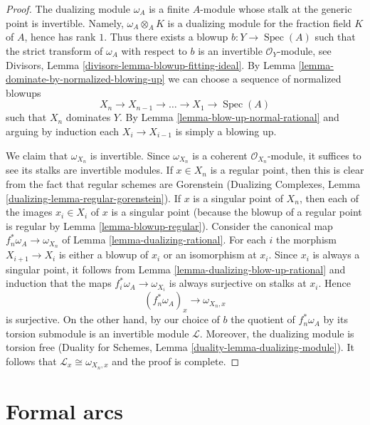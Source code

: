 \documentclass{stacks-project}
\theoremstyle{plain}
\theoremstyle{definition}
\theoremstyle{remark}
\numberwithin{equation}{subsection}
\def\Spec{\mathop{\mathrm{Spec}}}
\begin{document}
\begin{proof}
The dualizing module $\omega_A$ is a finite $A$-module whose stalk at
the generic point is invertible. Namely, $\omega_A \otimes_A K$
is a dualizing module for the fraction field $K$ of $A$, hence has
rank $1$. Thus there exists a blowup $b : Y \to \Spec(A)$ such that
the strict transform of $\omega_A$ with respect to $b$ is an invertible
$\mathcal{O}_Y$-module, see
Divisors, Lemma \ref{divisors-lemma-blowup-fitting-ideal}.
By Lemma \ref{lemma-dominate-by-normalized-blowing-up}
we can choose a sequence of normalized blowups
$$
X_n \to X_{n - 1} \to \ldots \to X_1 \to \Spec(A)
$$
such that $X_n$ dominates $Y$. By Lemma \ref{lemma-blow-up-normal-rational}
and arguing by induction each $X_i \to X_{i - 1}$ is simply a blowing up.

\medskip\noindent
We claim that $\omega_{X_n}$ is invertible. Since $\omega_{X_n}$
is a coherent $\mathcal{O}_{X_n}$-module, it suffices to see its stalks
are invertible modules. If $x \in X_n$ is a regular point, then this is
clear from the fact that regular schemes are
Gorenstein (Dualizing Complexes, Lemma
\ref{dualizing-lemma-regular-gorenstein}). If $x$ is a singular point of
$X_n$, then each of the images $x_i \in X_i$ of $x$ is a singular point
(because the blowup of a regular point is regular by
Lemma \ref{lemma-blowup-regular}).
Consider the canonical map $f_n^*\omega_A \to \omega_{X_n}$ of
Lemma \ref{lemma-dualizing-rational}. For each $i$ the morphism
$X_{i + 1} \to X_i$ is either a blowup of $x_i$ or an isomorphism
at $x_i$. Since $x_i$ is always a singular point, it follows from
Lemma \ref{lemma-dualizing-blow-up-rational}
and induction that the maps $f_i^*\omega_A \to \omega_{X_i}$
is always surjective on stalks at $x_i$. Hence
$$
(f_n^*\omega_A)_x \longrightarrow \omega_{X_n, x}
$$
is surjective. On the other hand, by our choice of $b$ the quotient
of $f_n^*\omega_A$ by its torsion submodule is an invertible module
$\mathcal{L}$. Moreover, the dualizing module is torsion free
(Duality for Schemes, Lemma \ref{duality-lemma-dualizing-module}).
It follows that $\mathcal{L}_x \cong  \omega_{X_n, x}$ and the proof is
complete.
\end{proof}






\section{Formal arcs}
\label{section-arcs}
\end{document}
